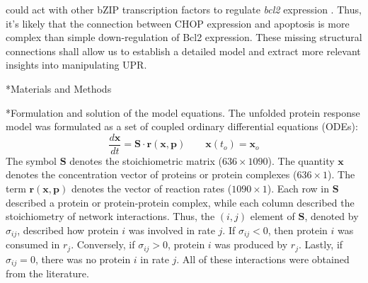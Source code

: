 \documentclass[12pt]{article}
\makeatletter
\renewcommand\subsection{\@startsection
	{subsection}{2}{0mm}
	{-0.05in}
	{-0.5\baselineskip}
	{\normalfont\normalsize\bfseries}}
\renewcommand\section{\@startsection
	{subsection}{2}{0mm}
	{-0.2in}
	{0.05\baselineskip}
	{\normalfont\large\bfseries}}
\makeatother
\begin{document}
could act with other bZIP transcription factors to regulate \emph{bcl2} expression \cite{mccullough2001gsc}. Thus, it's likely that the connection between CHOP expression and apoptosis is more complex than simple down-regulation of Bcl2 expression. These missing structural connections shall allow us to establish a detailed model and extract more relevant insights into manipulating UPR. 


\clearpage
\section*{Materials and Methods}

\subsection*{Formulation and solution of the model equations.}
The unfolded protein response model was formulated as a set of coupled ordinary differential equations (ODEs):
\begin{equation}\label{asseassertain_massbalance}
\frac{d\mathbf{x}}{dt}=\mathbf{S}\cdot\mathbf{r}\left(\mathbf{x},\mathbf{p}\right)\qquad\mathbf{x}\left(t_{o}\right)=\mathbf{x}_{o}
\end{equation}
The symbol $\mathbf{S}$ denotes the stoichiometric matrix ($636\times 1090$). The quantity $\mathbf{x}$ denotes the concentration vector of proteins or protein complexes ($636\times 1$). 
The term $\mathbf{r}\left(\mathbf{x},\mathbf{p}\right)$ denotes the vector of reaction rates ($1090\times{1}$). 
Each row in $\mathbf{S}$ described a protein or protein-protein complex,
while each column described the stoichiometry of network interactions. 
Thus, the $(i,j)$ element of $\mathbf{S}$, denoted by $\sigma_{ij}$, described how protein $i$ was involved in rate $j$. 
If $\sigma_{ij}<0$, then protein $i$ was consumed in $r_j$. Conversely, if $\sigma_{ij}>0$, protein $i$ was
produced by $r_j$. Lastly, if $\sigma_{ij}=0$, there was no protein $i$ in rate $j$. All of these interactions were obtained from the literature. 
\end{document}
